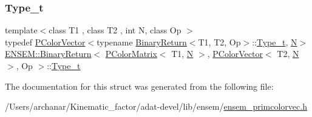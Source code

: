 \subsubsection{\texorpdfstring{Type\_t}{Type\_t}\hspace{0.1cm}{\footnotesize\ttfamily [3/3]}}
{\footnotesize\ttfamily template$<$class T1 , class T2 , int N, class Op $>$ \\
typedef \mbox{\hyperlink{classENSEM_1_1PColorVector}{P\+Color\+Vector}}$<$typename \mbox{\hyperlink{structENSEM_1_1BinaryReturn}{Binary\+Return}}$<$T1, T2, Op$>$\+::\mbox{\hyperlink{structENSEM_1_1BinaryReturn_3_01PColorMatrix_3_01T1_00_01N_01_4_00_01PColorVector_3_01T2_00_01N_01_4_00_01Op_01_4_a43baedf767080e4540d1752234039521}{Type\+\_\+t}}, \mbox{\hyperlink{adat__devel_2lib_2hadron_2operator__name__util_8cc_a7722c8ecbb62d99aee7ce68b1752f337}{N}}$>$ \mbox{\hyperlink{structENSEM_1_1BinaryReturn}{E\+N\+S\+E\+M\+::\+Binary\+Return}}$<$ \mbox{\hyperlink{classENSEM_1_1PColorMatrix}{P\+Color\+Matrix}}$<$ T1, \mbox{\hyperlink{adat__devel_2lib_2hadron_2operator__name__util_8cc_a7722c8ecbb62d99aee7ce68b1752f337}{N}} $>$, \mbox{\hyperlink{classENSEM_1_1PColorVector}{P\+Color\+Vector}}$<$ T2, \mbox{\hyperlink{adat__devel_2lib_2hadron_2operator__name__util_8cc_a7722c8ecbb62d99aee7ce68b1752f337}{N}} $>$, Op $>$\+::\mbox{\hyperlink{structENSEM_1_1BinaryReturn_3_01PColorMatrix_3_01T1_00_01N_01_4_00_01PColorVector_3_01T2_00_01N_01_4_00_01Op_01_4_a43baedf767080e4540d1752234039521}{Type\+\_\+t}}}



The documentation for this struct was generated from the following file\+:\begin{DoxyCompactItemize}
\item 
/\+Users/archanar/\+Kinematic\+\_\+factor/adat-\/devel/lib/ensem/\mbox{\hyperlink{adat-devel_2lib_2ensem_2ensem__primcolorvec_8h}{ensem\+\_\+primcolorvec.\+h}}\end{DoxyCompactItemize}
